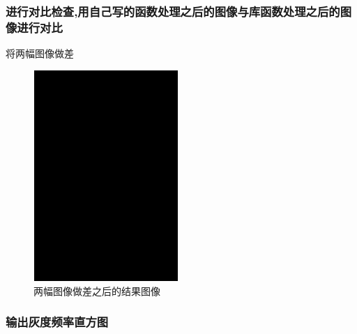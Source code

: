 \documentclass{article}
\begin{document}
  \subsubsection{进行对比检查,用自己写的函数处理之后的图像与库函数处理之后的图像进行对比}

  将两幅图像做差
  \begin{figure}[h!]
                \centering
                \includegraphics[width=5.5cm,height=8cm]{xuan4.png}
                \caption{两幅图像做差之后的结果图像}
                \end{figure}
   \subsubsection{输出灰度频率直方图}
\end{document}
